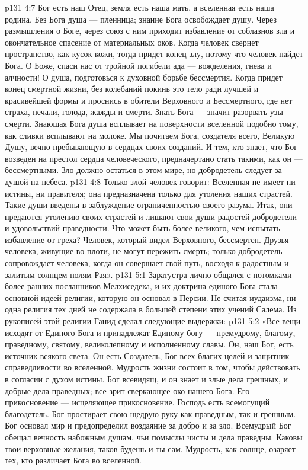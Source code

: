 \vs p131 4:7 Бог есть наш Отец, земля есть наша мать, а вселенная есть наша родина. Без Бога душа --- пленница; знание Бога освобождает душу. Через размышления о Боге, через союз с ним приходит избавление от соблазнов зла и окончательное спасение от материальных оков. Когда человек свернет пространство, как кусок кожи, тогда придет конец злу, потому что человек найдет Бога. О Боже, спаси нас от тройной погибели ада --- вожделения, гнева и алчности! О душа, подготовься к духовной борьбе бессмертия. Когда придет конец смертной жизни, без колебаний покинь это тело ради лучшей и красивейшей формы и проснись в обители Верховного и Бессмертного, где нет страха, печали, голода, жажды и смерти. Знать Бога --- значит разорвать узы смерти. Знающая Бога душа всплывает на поверхности вселенной подобно тому, как сливки всплывают на молоке. Мы почитаем Бога, создателя всего, Великую Душу, вечно пребывающую в сердцах своих созданий. И тем, кто знает, что Бог возведен на престол сердца человеческого, предначертано стать такими, как он --- бессмертными. Зло должно остаться в этом мире, но добродетель следует за душой на небеса.
\vs p131 4:8 Только злой человек говорит: Вселенная не имеет ни истины, ни правителя; она предназначена только для утоления наших страстей. Такие души введены в заблуждение ограниченностью своего разума. Итак, они предаются утолению своих страстей и лишают свои души радостей добродетели и удовольствий праведности. Что может быть более великого, чем испытать избавление от греха? Человек, который видел Верховного, бессмертен. Друзья человека, живущие во плоти, не могут пережить смерть; только добродетель сопровождает человека, когда он совершает свой путь, восходя к радостным и залитым солнцем полям Рая».
\vs p131 5:1 Заратустра лично общался с потомками более ранних посланников Мелхиседека, и их доктрина единого Бога стала основной идеей религии, которую он основал в Персии. Не считая иудаизма, ни одна религия тех дней не содержала в большей степени этих учений Салема. Из рукописей этой религии Ганид сделал следующие выдержки:
\vs p131 5:2 \pc «Все вещи исходят от Единого Бога и принадлежат Единому богу --- премудрому, благому, праведному, святому, великолепному и исполненному славы. Он, наш Бог, есть источник всякого света. Он есть Создатель, Бог всех благих целей и защитник справедливости во вселенной. Мудрость жизни состоит в том, чтобы действовать в согласии с духом истины. Бог всевидящ, и он знает и злые дела грешных, и добрые дела праведных; все зрит сверкающее око нашего Бога. Его прикосновение --- исцеляющее прикосновение. Господь есть всемогущий благодетель. Бог простирает свою щедрую руку как праведным, так и грешным. Бог основал мир и предопределил воздаяние за добро и за зло. Всемудрый Бог обещал вечность набожным душам, чьи помыслы чисты и дела праведны. Каковы твои верховные желания, таков будешь и ты сам. Мудрость, как солнце, озаряет тех, кто различает Бога во вселенной.
